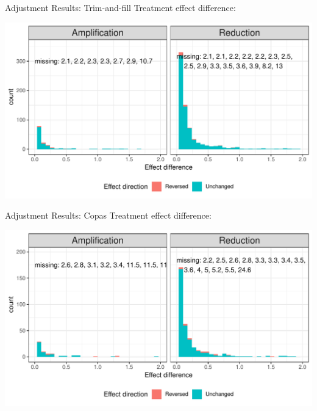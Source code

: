 \documentclass[english]{beamer}\usepackage[]{graphicx}\usepackage[]{color}
\makeatletter
\def\maxwidth{ %
  \ifdim\Gin@nat@width>\linewidth
    \linewidth
  \else
    \Gin@nat@width
  \fi
}
\newenvironment{knitrout}{}{} %
\makeatother
\begin{document}

\begin{frame}[fragile]{Adjustment Results: Trim-and-fill}
Treatment effect difference:

\vspace{-3mm}
\begin{knitrout}
\color{fgcolor}
\includegraphics[width=\maxwidth]{figure/unnamed-chunk-18-1} 

\end{knitrout}
\end{frame}


\begin{frame}[fragile]{Adjustment Results: Copas}
Treatment effect difference:

\vspace{-3mm}
\begin{knitrout}
\color{fgcolor}
\includegraphics[width=\maxwidth]{figure/unnamed-chunk-19-1} 

\end{knitrout}
\end{frame}
\end{document}
